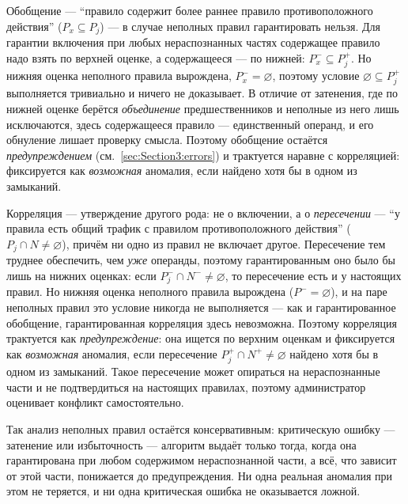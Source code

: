 Обобщение --- ``правило содержит более раннее правило противоположного действия'' ($P_x \subseteq P_j$) --- в случае неполных правил гарантировать нельзя. Для гарантии включения при любых нераспознанных частях содержащее правило надо взять по верхней оценке, а содержащееся --- по нижней: $P_x^- \subseteq P_j^+$. Но нижняя оценка неполного правила вырождена, $P_x^- = \varnothing$, поэтому условие $\varnothing \subseteq P_j^+$ выполняется тривиально и ничего не доказывает. В отличие от затенения, где по нижней оценке берётся \emph{объединение} предшественников и неполные из него лишь исключаются, здесь содержащееся правило --- единственный операнд, и его обнуление лишает проверку смысла. Поэтому обобщение остаётся \emph{предупреждением} (см.~\ref{sec:Section3:errors}) и трактуется наравне с корреляцией: фиксируется как \emph{возможная} аномалия, если найдено хотя бы в одном из замыканий.

Корреляция --- утверждение другого рода: не о включении, а о \emph{пересечении} --- ``у правила есть общий трафик с правилом противоположного действия'' ($P_j \cap N \neq \varnothing$), причём ни одно из правил не включает другое. Пересечение тем труднее обеспечить, чем \emph{уже} операнды, поэтому гарантированным оно было бы лишь на нижних оценках: если $P_j^- \cap N^- \neq \varnothing$, то пересечение есть и у настоящих правил. Но нижняя оценка неполного правила вырождена ($P^- = \varnothing$), и на паре неполных правил это условие никогда не выполняется --- как и гарантированное обобщение, гарантированная корреляция здесь невозможна. Поэтому корреляция трактуется как \emph{предупреждение}: она ищется по верхним оценкам и фиксируется как \emph{возможная} аномалия, если пересечение $P_j^+ \cap N^+ \neq \varnothing$ найдено хотя бы в одном из замыканий. Такое пересечение может опираться на нераспознанные части и не подтвердиться на настоящих правилах, поэтому администратор оценивает конфликт самостоятельно.

Так анализ неполных правил остаётся консервативным: критическую ошибку --- затенение или избыточность --- алгоритм выдаёт только тогда, когда она гарантирована при любом содержимом нераспознанной части, а всё, что зависит от этой части, понижается до предупреждения. Ни одна реальная аномалия при этом не теряется, и ни одна критическая ошибка не оказывается ложной.

\newpage